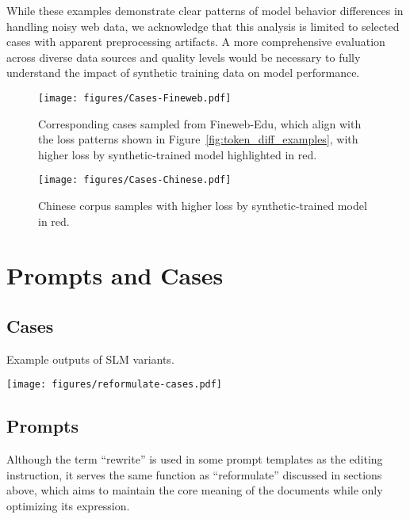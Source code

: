 While these examples demonstrate clear patterns of model behavior differences in handling noisy web data, we acknowledge that this analysis is limited to selected cases with apparent preprocessing artifacts. A more comprehensive evaluation across diverse data sources and quality levels would be necessary to fully understand the impact of synthetic training data on model performance.

\begin{figure*}[htb!]
    \centering
    \texttt{[image: figures/Cases-Fineweb.pdf]}
    \vspace{-2em}
    \caption{Corresponding cases sampled from Fineweb-Edu, which align with the loss patterns shown in Figure~\ref{fig:token_diff_examples}, with higher loss by synthetic-trained model highlighted in \colorbox{red!15}{red}.}
    \label{fig:cases_fineweb}
\end{figure*}

\begin{figure*}[htb!]
    \centering
    \texttt{[image: figures/Cases-Chinese.pdf]}
    \vspace{-2em}
    \caption{Chinese corpus samples with higher loss by synthetic-trained model in \colorbox{red!15}{red}.}
    \label{fig:cases_chinese}
\end{figure*}

\clearpage
\section{Prompts and Cases}
\label{sec:appd_prompt}

\subsection{Cases}
\begin{table*}[h]
    \centering
    \caption{Example outputs of SLM variants.}
    \texttt{[image: figures/reformulate-cases.pdf]}
\end{table*}

\clearpage
\subsection{Prompts}
Although the term ``rewrite'' is used in some prompt templates as the editing instruction, it serves the same function as ``reformulate'' discussed in sections above, which aims to maintain the core meaning of the documents while only optimizing its expression.


